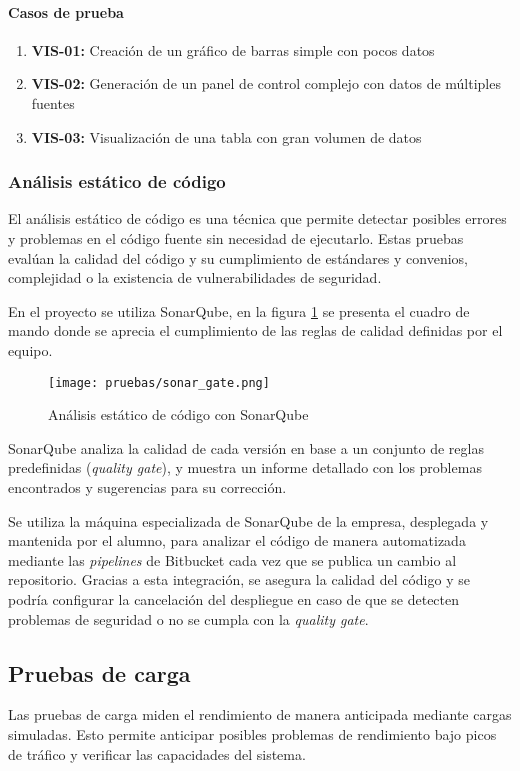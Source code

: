 \paragraph{Casos de prueba}
\begin{enumerate}
    \item \textbf{VIS-01:} Creación de un gráfico de barras simple con pocos datos
    \item \textbf{VIS-02:} Generación de un panel de control complejo con datos de múltiples fuentes
    \item \textbf{VIS-03:} Visualización de una tabla con gran volumen de datos
\end{enumerate}


\newpage{}
\subsubsection{Análisis estático de código}
El análisis estático de código es una técnica que permite detectar posibles
errores y problemas en el código fuente sin necesidad de ejecutarlo. Estas
pruebas evalúan la calidad del código y su cumplimiento de estándares y
convenios, complejidad o la existencia de vulnerabilidades de seguridad.

En el proyecto se utiliza SonarQube, en la figura \ref{fig:sonarqube} se
presenta el cuadro de mando donde se aprecia el cumplimiento de las reglas de
calidad definidas por el equipo.

\begin{figure}[H]
	\centering
	\texttt{[image: pruebas/sonar\_gate.png]}
	\caption{Análisis estático de código con SonarQube}
	\label{fig:sonarqube}
\end{figure}

SonarQube analiza la calidad de cada versión en base a un conjunto de reglas
predefinidas (\textit{quality gate}), y muestra un informe detallado con los
problemas encontrados y sugerencias para su corrección.

Se utiliza la máquina especializada de SonarQube de la empresa, desplegada y
mantenida por el alumno, para analizar el código de manera automatizada mediante
las \textit{pipelines} de Bitbucket cada vez que se publica un cambio al
repositorio. Gracias a esta integración, se asegura la calidad del código y se
podría configurar la cancelación del despliegue en caso de que se detecten
problemas de seguridad o no se cumpla con la \textit{quality gate}.


\newpage{}
\subsection{Pruebas de carga}
Las pruebas de carga miden el rendimiento de manera anticipada mediante cargas
simuladas. Esto permite anticipar posibles problemas de rendimiento bajo picos
de tráfico y verificar las capacidades del sistema.


